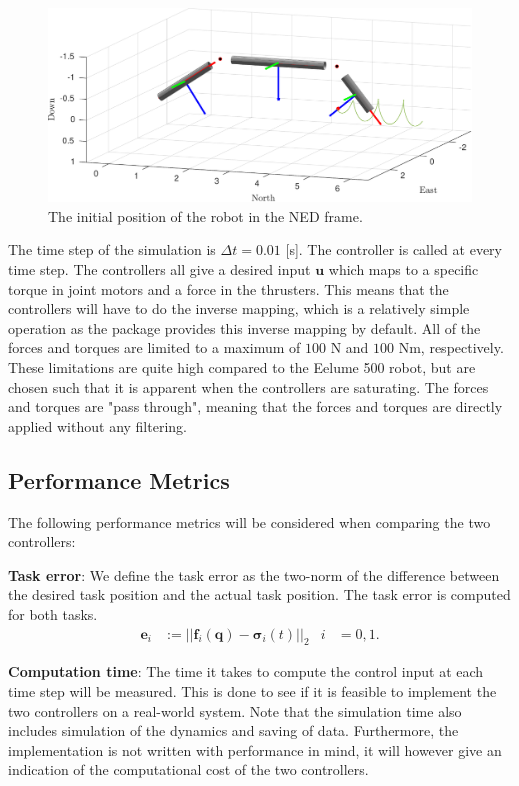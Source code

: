 \begin{figure}[h]
    \centering
    \includegraphics[width=\linewidth]{assets/plots/initial_pos.pdf}
    \caption{The initial position of the robot in the NED frame.}
    \label{fig:init_pos}
\end{figure}
The time step of the simulation is $\Delta t = 0.01$ [s]. The controller is
called at every time step. The controllers all give a desired input $\bm{u}$ which
maps to a specific torque in joint motors and a force in the thrusters.
This means that the controllers will have to do the inverse mapping, which
is a relatively simple operation as the \pymuvs package provides this inverse
mapping by default. All of
the forces and torques are limited to a maximum of $100$ N and $100$ Nm, respectively.
These limitations are quite high compared to the Eelume 500 robot, but are chosen
such that it is apparent when the controllers are saturating. The forces and torques
are "pass through", meaning that the forces and torques are directly applied without
any filtering.

\subsection{Performance Metrics}
The following performance metrics will be considered when comparing the two controllers:

\textbf{Task error}: We define the task error as the two-norm of the difference
between the desired task position and the actual task position. The task error
is computed for both tasks.
\begin{align}
    \bm{e}_i &:= ||\bm{f}_i(\bm{q}) - \bm{\sigma}_i(t)||_2 &
        i &= 0, 1.
\end{align}

\textbf{Computation time}: The time it takes to compute the control input at each
time step will be measured. This is done to see if it is feasible to implement the
two controllers on a real-world system. Note that the simulation time also includes
simulation of the dynamics and saving of data. Furthermore, the implementation is
not written with performance in mind, it will however give an indication of the
computational cost of the two controllers.

